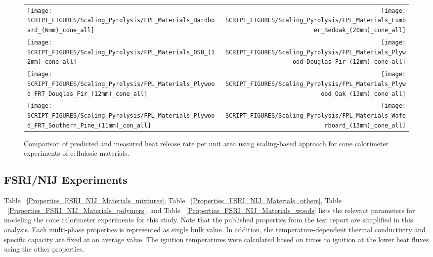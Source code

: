 \begin{figure}[p]
\begin{tabular*}{\textwidth}{l@{\extracolsep{\fill}}r}
\texttt{[image: SCRIPT\_FIGURES/Scaling\_Pyrolysis/FPL\_Materials\_Hardboard\_(6mm)\_cone\_all]} &
\texttt{[image: SCRIPT\_FIGURES/Scaling\_Pyrolysis/FPL\_Materials\_Lumber\_Redoak\_(20mm)\_cone\_all]} \\
\texttt{[image: SCRIPT\_FIGURES/Scaling\_Pyrolysis/FPL\_Materials\_OSB\_(12mm)\_cone\_all]} &
\texttt{[image: SCRIPT\_FIGURES/Scaling\_Pyrolysis/FPL\_Materials\_Plywood\_Douglas\_Fir\_(12mm)\_cone\_all]} \\
\texttt{[image: SCRIPT\_FIGURES/Scaling\_Pyrolysis/FPL\_Materials\_Plywood\_FRT\_Douglas\_Fir\_(12mm)\_cone\_all]} &
\texttt{[image: SCRIPT\_FIGURES/Scaling\_Pyrolysis/FPL\_Materials\_Plywood\_Oak\_(13mm)\_cone\_all]} \\
\texttt{[image: SCRIPT\_FIGURES/Scaling\_Pyrolysis/FPL\_Materials\_Plywood\_FRT\_Southern\_Pine\_(11mm)\_con\_all]} &
\texttt{[image: SCRIPT\_FIGURES/Scaling\_Pyrolysis/FPL\_Materials\_Waferboard\_(13mm)\_cone\_all]} \\
\end{tabular*}
\caption[HRRPUA of FPL materials using scaling model]
{Comparison of predicted and measured heat release rate per unit area using scaling-based approach for cone calorimeter experiments of cellulosic materials.}
\label{FPL_Wood_HRR_woods}
\end{figure}


\clearpage





\subsection{FSRI/NIJ Experiments}\label{sec_FSRI_NIJ_Materials}

Table ~\ref{Properties_FSRI_NIJ_Materials_mixtures}, Table ~\ref{Properties_FSRI_NIJ_Materials_others}, Table ~\ref{Properties_FSRI_NIJ_Materials_polymers}, and Table ~\ref{Properties_FSRI_NIJ_Materials_woods} lists the relevant parameters for modeling the cone calorimeter experiments for this study.
Note that the published properties from the test report are simplified in this analysis. Each multi-phase properties is represented as single bulk value.
In addition, the temperature-dependent thermal conductivity and specific capacity are fixed at an average value.
The ignition temperatures were calculated based on times to ignition at the lower heat fluxes using the other properties.


